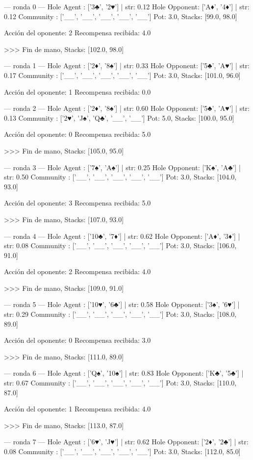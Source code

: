 
--- ronda 0 ---
Hole Agent : ['3♣', '2♥'] | str: 0.12
Hole Opponent: ['A♦', '4♦'] | str: 0.12
Community  : ['__', '__', '__', '__', '__']
Pot: 3.0, Stacks: [99.0, 98.0]

Acción del oponente: 2
Recompensa recibida: 4.0

>>> Fin de mano, Stacks: [102.0, 98.0]


--- ronda 1 ---
Hole Agent : ['2♦', '8♠'] | str: 0.33
Hole Opponent: ['5♣', 'A♥'] | str: 0.17
Community  : ['__', '__', '__', '__', '__']
Pot: 3.0, Stacks: [101.0, 96.0]

Acción del oponente: 1
Recompensa recibida: 0.0

--- ronda 2 ---
Hole Agent : ['2♦', '8♠'] | str: 0.60
Hole Opponent: ['5♣', 'A♥'] | str: 0.13
Community  : ['2♥', 'J♠', 'Q♣', '__', '__']
Pot: 5.0, Stacks: [100.0, 95.0]

Acción del oponente: 0
Recompensa recibida: 5.0

>>> Fin de mano, Stacks: [105.0, 95.0]


--- ronda 3 ---
Hole Agent : ['7♠', 'A♠'] | str: 0.25
Hole Opponent: ['K♠', 'A♣'] | str: 0.50
Community  : ['__', '__', '__', '__', '__']
Pot: 3.0, Stacks: [104.0, 93.0]

Acción del oponente: 3
Recompensa recibida: 5.0

>>> Fin de mano, Stacks: [107.0, 93.0]


--- ronda 4 ---
Hole Agent : ['10♣', '7♦'] | str: 0.62
Hole Opponent: ['A♦', '3♦'] | str: 0.08
Community  : ['__', '__', '__', '__', '__']
Pot: 3.0, Stacks: [106.0, 91.0]

Acción del oponente: 2
Recompensa recibida: 4.0

>>> Fin de mano, Stacks: [109.0, 91.0]


--- ronda 5 ---
Hole Agent : ['10♥', '6♣'] | str: 0.58
Hole Opponent: ['3♠', '6♥'] | str: 0.29
Community  : ['__', '__', '__', '__', '__']
Pot: 3.0, Stacks: [108.0, 89.0]

Acción del oponente: 0
Recompensa recibida: 3.0

>>> Fin de mano, Stacks: [111.0, 89.0]


--- ronda 6 ---
Hole Agent : ['Q♠', '10♠'] | str: 0.83
Hole Opponent: ['K♣', '5♣'] | str: 0.67
Community  : ['__', '__', '__', '__', '__']
Pot: 3.0, Stacks: [110.0, 87.0]

Acción del oponente: 1
Recompensa recibida: 4.0

>>> Fin de mano, Stacks: [113.0, 87.0]


--- ronda 7 ---
Hole Agent : ['6♥', 'J♥'] | str: 0.62
Hole Opponent: ['2♦', '2♣'] | str: 0.08
Community  : ['__', '__', '__', '__', '__']
Pot: 3.0, Stacks: [112.0, 85.0]

